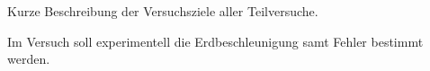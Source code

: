 \documentclass{protokoll}
\begin{document}
\begin{versuchsziele}
  Kurze Beschreibung der Versuchsziele aller Teilversuche.
\end{versuchsziele}
Im Versuch soll experimentell die Erdbeschleunigung samt Fehler bestimmt werden.

%
%
%
%
%

%
%


%
%

%
%
%
%


%
%
%
%

%
%
%
%


%
%

%

%

%

%
%



% 
%
\end{document}
